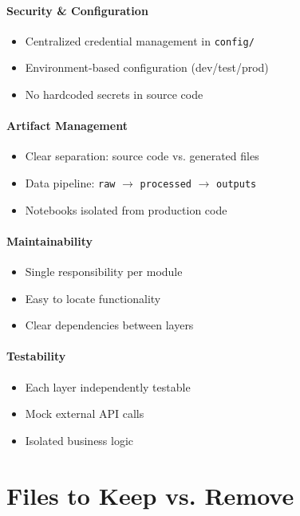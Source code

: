 \documentclass[11pt,a4paper]{article}
\begin{document}
\paragraph{Security \& Configuration}
\begin{itemize}
    \item Centralized credential management in \texttt{config/}
    \item Environment-based configuration (dev/test/prod)
    \item No hardcoded secrets in source code
\end{itemize}

\paragraph{Artifact Management}
\begin{itemize}
    \item Clear separation: source code vs. generated files
    \item Data pipeline: \texttt{raw} $\rightarrow$ \texttt{processed} $\rightarrow$ \texttt{outputs}
    \item Notebooks isolated from production code
\end{itemize}

\paragraph{Maintainability}
\begin{itemize}
    \item Single responsibility per module
    \item Easy to locate functionality
    \item Clear dependencies between layers
\end{itemize}

\paragraph{Testability}
\begin{itemize}
    \item Each layer independently testable
    \item Mock external API calls
    \item Isolated business logic
\end{itemize}

\section{Files to Keep vs. Remove}
\end{document}
